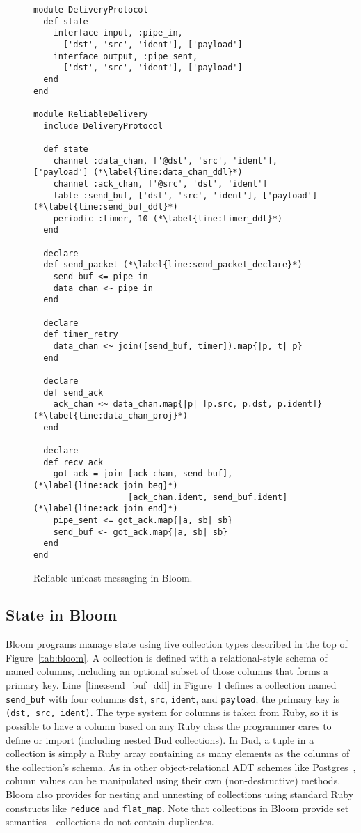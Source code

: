 \begin{figure}[t]
\begin{scriptsize}
\begin{lstlisting}
module DeliveryProtocol
  def state
    interface input, :pipe_in,
      ['dst', 'src', 'ident'], ['payload']
    interface output, :pipe_sent,
      ['dst', 'src', 'ident'], ['payload']
  end
end

module ReliableDelivery
  include DeliveryProtocol

  def state
    channel :data_chan, ['@dst', 'src', 'ident'], ['payload'] (*\label{line:data_chan_ddl}*)
    channel :ack_chan, ['@src', 'dst', 'ident']
    table :send_buf, ['dst', 'src', 'ident'], ['payload'] (*\label{line:send_buf_ddl}*)
    periodic :timer, 10 (*\label{line:timer_ddl}*)
  end

  declare
  def send_packet (*\label{line:send_packet_declare}*)
    send_buf <= pipe_in
    data_chan <~ pipe_in
  end

  declare
  def timer_retry
    data_chan <~ join([send_buf, timer]).map{|p, t| p}
  end

  declare
  def send_ack
    ack_chan <~ data_chan.map{|p| [p.src, p.dst, p.ident]} (*\label{line:data_chan_proj}*)
  end

  declare
  def recv_ack
    got_ack = join [ack_chan, send_buf], (*\label{line:ack_join_beg}*)
                   [ack_chan.ident, send_buf.ident] (*\label{line:ack_join_end}*)
    pipe_sent <= got_ack.map{|a, sb| sb}
    send_buf <- got_ack.map{|a, sb| sb}
  end
end
\end{lstlisting}
\centering
\vspace{-10pt}
\caption{Reliable unicast messaging in Bloom.}
\label{fig:bloom-example}
\end{scriptsize}
\vspace{-2pt}
\end{figure}

\subsection{State in Bloom}
Bloom programs manage state using five collection types described in the top of
Figure~\ref{tab:bloom}. A collection is defined with a relational-style schema
of named columns, including an optional subset of those columns that forms a
primary key. Line~\ref{line:send_buf_ddl} in Figure~\ref{fig:bloom-example}
defines a collection named \texttt{send\_buf} with four columns \texttt{dst},
\texttt{src}, \texttt{ident}, and \texttt{payload}; the primary key is
\texttt{(dst,~src,~ident)}. The type system for columns is taken from Ruby, so
it is possible to have a column based on any Ruby class the programmer cares to
define or import (including nested Bud collections).  In Bud, a tuple in a
collection is simply a Ruby array containing as many elements as the columns of
the collection's schema.  As in other object-relational ADT schemes like
Postgres~\cite{postgres-adt}, column values can be manipulated using their own
(non-destructive) methods. Bloom also provides for nesting and unnesting of
collections using standard Ruby constructs like \texttt{reduce} and
\texttt{flat\_map}. Note that collections in Bloom provide set
semantics---collections do not contain duplicates.

